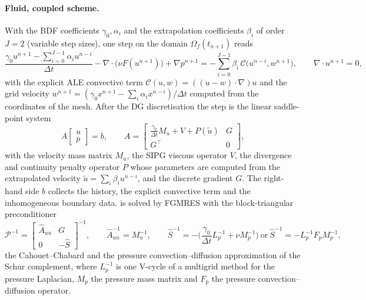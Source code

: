 \documentclass[11pt,a4paper]{article}
\theoremstyle{definition}
\theoremstyle{remark}
\newcommand{\G}{\Gamma}
\begin{document}
\paragraph{Fluid, coupled scheme.} With the BDF coefficients $\gamma_0,\alpha_i$ and the
extrapolation coefficients $\beta_i$ of order $J=2$ (variable step sizes), one step on the domain
$\Omega_f(t_{n+1})$ reads
\begin{equation}\label{eq:bdf}
  \frac{\gamma_0u^{n+1}-\sum_{i=0}^{J-1}\alpha_iu^{n-i}}{\Delta t}
  -\nabla\cdot\big(\nu F(u^{n+1})\big)+\nabla p^{n+1}
  = -\sum_{i=0}^{J-1}\beta_i\,\mathcal C\big(u^{n-i},w^{n+1}\big),\qquad
  \nabla\cdot u^{n+1}=0,
\end{equation}
with the explicit ALE convective term $\mathcal C(u,w)=((u-w)\cdot\nabla)u$ and the grid velocity
$w^{n+1}=(\gamma_0x^{n+1}-\sum_i\alpha_ix^{n-i})/\Delta t$ computed from the coordinates of the
mesh. After the DG discretisation the step is the linear saddle-point system
\begin{equation}\label{eq:saddle}
  A\begin{bmatrix}u\\p\end{bmatrix}=b,\qquad
  A=\begin{bmatrix}\frac{\gamma_0}{\Delta t}M_u+V+P(\tilde u)&G\\G^{\top}&0\end{bmatrix},
\end{equation}
with the velocity mass matrix $M_u$, the SIPG viscous operator $V$, the divergence and continuity
penalty operator $P$ whose parameters are computed from the extrapolated velocity
$\tilde u=\sum_i\beta_iu^{n-i}$, and the discrete gradient $G$. The right-hand side $b$ collects the
history, the explicit convective term and the inhomogeneous boundary data.  is
solved by FGMRES with the block-triangular preconditioner
\begin{equation}\label{eq:block_prec}
  \mathcal P^{-1}=\begin{bmatrix}\hat A_{uu}&G\\0&-\hat S\end{bmatrix}^{-1},\qquad
  \hat A_{uu}^{-1}=M_u^{-1},\qquad
  \hat S^{-1}=-\Big(\frac{\gamma_0}{\Delta t}L_p^{-1}+\nu M_p^{-1}\Big)\ \text{or}\
  \hat S^{-1}=-L_p^{-1}F_pM_p^{-1},
\end{equation}
the Cahouet--Chabard and the pressure convection--diffusion approximation of the Schur complement,
where $L_p^{-1}$ is one V-cycle of a multigrid method for the pressure Laplacian, $M_p$ the
pressure mass matrix and $F_p$ the pressure convection--diffusion operator.
\end{document}
